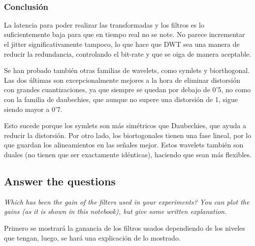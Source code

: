 \documentclass[11pt]{article}
\begin{document}
    \begin{center}
    \end{center}
    { \hspace*{\fill} \\}
    
    \subsubsection{Conclusión}\label{conclusiuxf3n}

    La latencia para poder realizar las transformadas y los filtros es lo
suficientemente baja para que en tiempo real no se note. No parece
incrementar el jitter significativamente tampoco, lo que hace que DWT
sea una manera de reducir la redundancia, controlando el bit-rate y que
se oiga de manera aceptable.

Se han probado también otras familias de wavelets, como symlets y
biorthogonal. Las dos últimas son excepcionalmente mejores a la hora de
eliminar distorsión con grandes cuantizaciones, ya que siempre se quedan
por debajo de 0'5, no como con la familia de daubechies, que aunque no
supere una distorsión de 1, sigue siendo mayor a 0'7.

Esto sucede porque los symlets son más simétricos que Daubechies, que
ayuda a reducir la distorsión. Por otro lado, los biortogonales tienen
una fase lineal, por lo que guardan los alineamientos en las señales
mejor. Estos wavelets también son duales (no tienen que ser exactamente
idénticas), haciendo que sean más flexibles.

    \subsection{Answer the questions}\label{answer-the-questions}

    \emph{Which has been the gain of the filters used in your experiments?
You can plot the gains (as it is shown in this notebook), but give some
written explanation.}

    Primero se mostrará la ganancia de los filtros usados dependiendo de los
niveles que tengan, luego, se hará una explicación de lo mostrado.
\end{document}
